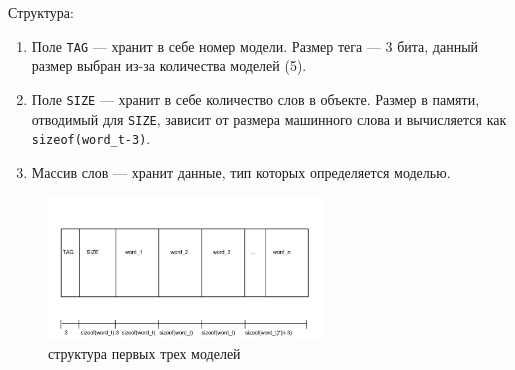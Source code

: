 Структура:
\begin{enumerate}
\item Поле \lstinline{TAG} --- хранит в себе номер модели. Размер тега --- 3 бита, данный размер выбран из-за количества моделей (5).
\item Поле \lstinline{SIZE} --- хранит в себе количество слов в объекте. Размер в памяти, отводимый для \lstinline{SIZE}, зависит от размера машинного слова и вычисляется как \lstinline{sizeof(word_t-3)}.
\item Массив слов --- хранит данные, тип которых определяется моделью.
\end{enumerate}

\begin{figure}[h]
\includegraphics[width=0.65\textwidth]{Kren/1}
\caption{структура первых трех моделей}
\label{first}
\end{figure}

